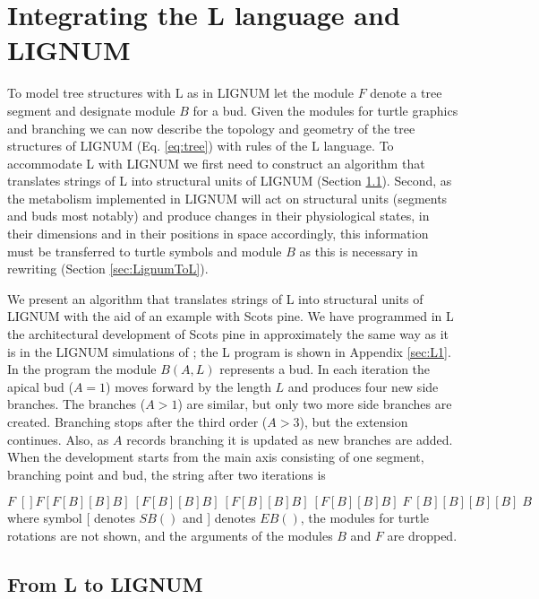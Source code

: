 \section{Integrating the L language and LIGNUM}\label{sec:pine}

To model tree structures with L as in LIGNUM let the module $F$ denote
a tree segment and designate module  $B$ for a bud.  Given the modules
for turtle graphics and branching we can now describe the topology and
geometry of  the tree structures  of LIGNUM (Eq.   \ref{eq:tree}) with
rules of the  L language.  To accommodate L with  LIGNUM we first need
to construct an algorithm that translates strings of L into structural
units  of  LIGNUM   (Section  \ref{sec:LToLignum}).   Second,  as  the
metabolism  implemented  in  LIGNUM   will  act  on  structural  units
(segments  and  buds  most  notably)  and  produce  changes  in  their
physiological states,  in their dimensions  and in their  positions in
space  accordingly, this  information  must be  transferred to  turtle
symbols  and module  $B$ as  this is  necessary in  rewriting (Section
\ref{sec:LignumToL}).

We present an  algorithm that translates strings of  L into structural
units of LIGNUM  with the aid of an example with  Scots pine.  We have
programmed  in  L  the  architectural  development of  Scots  pine  in
approximately  the same  way as  it is  in the  LIGNUM  simulations of
\citet{perttunen:96, perttunen:98}; the L program is shown in Appendix
\ref{sec:L1}.  In the program the module $B(A,L)$ represents a bud. In
each iteration  the apical bud ($A  = 1$) moves forward  by the length
$L$ and produces  four new side branches.  The branches  ($A > 1$) are
similar, but only two more side branches are created.  Branching stops
after the third order ($A > 3$), but the extension continues. Also, as
$A$ records  branching it is updated  as new branches  are added. When
the development starts  from the main axis consisting  of one segment,
branching point and bud, the string after two iterations is

\begin{equation}\label{eq:pine2}
F\;[] F [F[B][B]B]\:[F[B][B]B]\:[F[B][B]B]\:[F[B][B]B]\; F \;[B][B][B][B]\; B
\end{equation}
where symbol  [ denotes $SB()$ and  ] denotes $EB()$,  the modules for
turtle rotations are  not shown, and the arguments  of the modules $B$
and $F$ are dropped.

\subsection{From L to LIGNUM}\label{sec:LToLignum}

